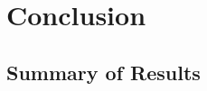 
\chapter{Conclusion}
\label{c:conclusion}


\section{Summary of Results}
\label{s:conclusions-summary}








